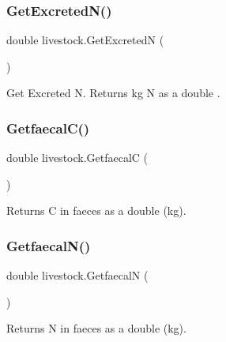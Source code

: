 \subsubsection{\texorpdfstring{GetExcretedN()}{GetExcretedN()}}
{\footnotesize\ttfamily double livestock.\+Get\+ExcretedN (\begin{DoxyParamCaption}{ }\end{DoxyParamCaption})\hspace{0.3cm}{\ttfamily [inline]}}



Get Excreted N. Returns kg N as a double . 

\mbox{\label{classlivestock_a91b8a5b2c1b40f6f010a8a3b8f67c5ed}} 
\subsubsection{\texorpdfstring{GetfaecalC()}{GetfaecalC()}}
{\footnotesize\ttfamily double livestock.\+GetfaecalC (\begin{DoxyParamCaption}{ }\end{DoxyParamCaption})\hspace{0.3cm}{\ttfamily [inline]}}



Returns C in faeces as a double (kg). 

\mbox{\label{classlivestock_a181b286d51da38385a3528d3b27a9734}} 
\subsubsection{\texorpdfstring{GetfaecalN()}{GetfaecalN()}}
{\footnotesize\ttfamily double livestock.\+GetfaecalN (\begin{DoxyParamCaption}{ }\end{DoxyParamCaption})\hspace{0.3cm}{\ttfamily [inline]}}



Returns N in faeces as a double (kg). 

\mbox{\label{classlivestock_ad34f357b0d2c43c8b919013227f50d8e}} 
